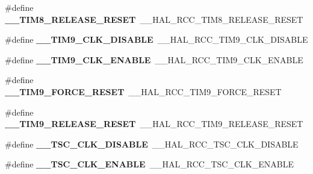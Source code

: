 \begin{DoxyCompactItemize}
\item 
\hypertarget{group___h_a_l___r_c_c___aliased_ga4e2c51ab362d5c8dc0271d3bf6841b8f}{\#define {\bfseries \-\_\-\-\_\-\-T\-I\-M8\-\_\-\-R\-E\-L\-E\-A\-S\-E\-\_\-\-R\-E\-S\-E\-T}~\-\_\-\-\_\-\-H\-A\-L\-\_\-\-R\-C\-C\-\_\-\-T\-I\-M8\-\_\-\-R\-E\-L\-E\-A\-S\-E\-\_\-\-R\-E\-S\-E\-T}\label{group___h_a_l___r_c_c___aliased_ga4e2c51ab362d5c8dc0271d3bf6841b8f}

\item 
\hypertarget{group___h_a_l___r_c_c___aliased_ga64ffa78e1f919fc30de9d32ed533dc3c}{\#define {\bfseries \-\_\-\-\_\-\-T\-I\-M9\-\_\-\-C\-L\-K\-\_\-\-D\-I\-S\-A\-B\-L\-E}~\-\_\-\-\_\-\-H\-A\-L\-\_\-\-R\-C\-C\-\_\-\-T\-I\-M9\-\_\-\-C\-L\-K\-\_\-\-D\-I\-S\-A\-B\-L\-E}\label{group___h_a_l___r_c_c___aliased_ga64ffa78e1f919fc30de9d32ed533dc3c}

\item 
\hypertarget{group___h_a_l___r_c_c___aliased_gaf62dcd57ef37f2836c3f222e774d25a4}{\#define {\bfseries \-\_\-\-\_\-\-T\-I\-M9\-\_\-\-C\-L\-K\-\_\-\-E\-N\-A\-B\-L\-E}~\-\_\-\-\_\-\-H\-A\-L\-\_\-\-R\-C\-C\-\_\-\-T\-I\-M9\-\_\-\-C\-L\-K\-\_\-\-E\-N\-A\-B\-L\-E}\label{group___h_a_l___r_c_c___aliased_gaf62dcd57ef37f2836c3f222e774d25a4}

\item 
\hypertarget{group___h_a_l___r_c_c___aliased_ga81fb5cbbf251d0b3b42a650399f327f2}{\#define {\bfseries \-\_\-\-\_\-\-T\-I\-M9\-\_\-\-F\-O\-R\-C\-E\-\_\-\-R\-E\-S\-E\-T}~\-\_\-\-\_\-\-H\-A\-L\-\_\-\-R\-C\-C\-\_\-\-T\-I\-M9\-\_\-\-F\-O\-R\-C\-E\-\_\-\-R\-E\-S\-E\-T}\label{group___h_a_l___r_c_c___aliased_ga81fb5cbbf251d0b3b42a650399f327f2}

\item 
\hypertarget{group___h_a_l___r_c_c___aliased_gadd936f6a03bac25d239ce2111dd77048}{\#define {\bfseries \-\_\-\-\_\-\-T\-I\-M9\-\_\-\-R\-E\-L\-E\-A\-S\-E\-\_\-\-R\-E\-S\-E\-T}~\-\_\-\-\_\-\-H\-A\-L\-\_\-\-R\-C\-C\-\_\-\-T\-I\-M9\-\_\-\-R\-E\-L\-E\-A\-S\-E\-\_\-\-R\-E\-S\-E\-T}\label{group___h_a_l___r_c_c___aliased_gadd936f6a03bac25d239ce2111dd77048}

\item 
\hypertarget{group___h_a_l___r_c_c___aliased_ga9fd4d359940ac569114e5dd75e6ccef7}{\#define {\bfseries \-\_\-\-\_\-\-T\-S\-C\-\_\-\-C\-L\-K\-\_\-\-D\-I\-S\-A\-B\-L\-E}~\-\_\-\-\_\-\-H\-A\-L\-\_\-\-R\-C\-C\-\_\-\-T\-S\-C\-\_\-\-C\-L\-K\-\_\-\-D\-I\-S\-A\-B\-L\-E}\label{group___h_a_l___r_c_c___aliased_ga9fd4d359940ac569114e5dd75e6ccef7}

\item 
\hypertarget{group___h_a_l___r_c_c___aliased_gae675868b2ceace795fcc61e356cce397}{\#define {\bfseries \-\_\-\-\_\-\-T\-S\-C\-\_\-\-C\-L\-K\-\_\-\-E\-N\-A\-B\-L\-E}~\-\_\-\-\_\-\-H\-A\-L\-\_\-\-R\-C\-C\-\_\-\-T\-S\-C\-\_\-\-C\-L\-K\-\_\-\-E\-N\-A\-B\-L\-E}\label{group___h_a_l___r_c_c___aliased_gae675868b2ceace795fcc61e356cce397}


\end{DoxyCompactItemize}
